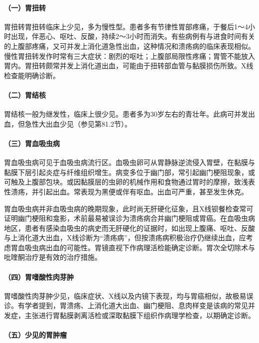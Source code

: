 \paragraph{（一）胃扭转}

胃扭转胃扭转临床上少见，多为慢性型。患者多有节律性胃部疼痛，于餐后1～4小时出现，伴恶心、呕吐、反酸，持续2～3小时而消失。有些病例有与进食时间有关的上腹部疼痛，又可并发上消化道急性出血，这种情况和溃疡病的临床表现相似。慢性胃扭转发作时常有三大症状：剧烈的呕吐；上腹部局限性疼痛；胃管不能放入胃内。胃扭转颇常并发上消化道出血，可能由于扭转部血管与黏膜损伤所致。X线检查能明确诊断。

\paragraph{（二）胃结核}

胃结核一般为继发性，临床上很少见。患者多为30岁左右的青壮年。此病可并发出血，但急性大出血少见（参见第81.2节）。

\paragraph{（三）胃血吸虫病}

胃血吸虫病可见于血吸虫病流行区。血吸虫卵可从胃静脉逆流侵入胃壁，在黏膜与黏膜下层引起炎症与纤维组织增生。病变多位于幽门部，常引起幽门梗阻现象，或可触及上腹部包块。或因黏膜层的虫卵的机械作用和食物通过胃时的摩擦，致浅表性溃疡，并引起出血。常表现为黑便或伴有呕血。出血可严重，甚至发生休克。

胃血吸虫病并非血吸虫病的晚期现象，此时尚无肝硬化征象，且X线钡餐检查常可证明幽门梗阻和龛影，术前最易被误诊为溃疡病合并幽门梗阻或胃癌。在血吸虫病地区，患者有感染血吸虫的病史而无肝硬化的证据时，如出现上腹痛、呕吐、反酸与上消化道大出血，X线诊断为“溃疡病”，但按溃疡病积极治疗仍继续出血，应考虑胃血吸虫病出血的可能性。胃镜直视下作病理活检能确定诊断。胃次全切除术与吡喹酮治疗是有效的治疗措施。

\paragraph{（四）胃嗜酸性肉芽肿}

胃嗜酸性肉芽肿少见，临床症状、X线以及内镜下表现，均与胃癌相似，故极易误诊。有学者提到，胃溃疡、上消化道大出血、幽门梗阻、息肉样变是该病的常见并发症，主张进行胃黏膜剥离活检或深取黏膜下组织作病理学检查，以期确定诊断。

\paragraph{（五）少见的胃肿瘤}


